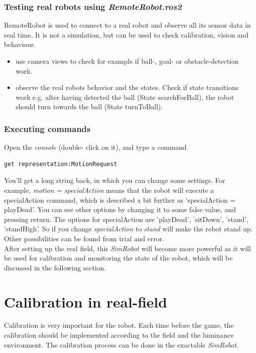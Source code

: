 \documentclass[a4paper]{article}
\begin{document}
\subsubsection{Testing real robots using \textit{RemoteRobot.ros2}}
RemoteRobot is used to connect to a real robot and observe all its sensor data in real time. It is not a simulation, but can be used to check calibration, vision and behaviour.
\begin{itemize}
  \item use camera views to check for example if ball-, goal- or obstacle-detection work.
  \item observe the real robots behavior and the states. Check if state transitions work e.g. after having detected the ball (State searchForBall), the robot should turn towards the ball (State turnToBall).
\end{itemize}
\subsubsection{Executing commands}
Open the \textit{console} (double- click on it), and type a command
\begin{lstlisting}
get representation:MotionRequest
\end{lstlisting}
You'll get a long string back, in which you can change some settings. For example, \textit{motion = specialAction} means that the robot will execute a specialAction command, which is described a bit further as `specialAction = playDead'. You can see other options by changing it to some false value, and pressing return.  The options for specialAction are 'playDead', 'sitDown', 'stand', 'standHigh'. So if you change \textit{specialAction} to \textit{stand} will make the robot stand up. Other possibilities can be found from trial and error.\\
After setting up the real field, this \textit{SimRobot} will become more powerful as it will be used for calibration and monitoring the state of the robot, which will be discussed in the following section. 

\clearpage
\section{Calibration in real-field}
Calibration is very important for the robot. Each time before the game, the calibration should be implemented according to the field and the luminance environment. The calibration process can be done in the exactable \textit{SimRobot}.
\end{document}
